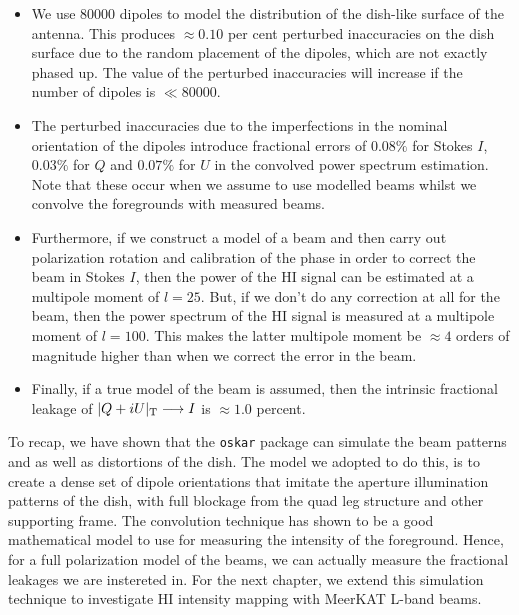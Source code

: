 \begin{itemize}
\item We use $80 000$ dipoles to model the distribution of the dish-like surface of the antenna. This produces $\approx 0.10$ per cent perturbed
inaccuracies on the dish surface due to the random placement of the dipoles, which are not exactly phased up. The value of the perturbed
inaccuracies will increase if the number of dipoles is $\ll 80 000$.
\item The perturbed inaccuracies due to the imperfections in the nominal orientation of the dipoles introduce fractional errors of
$0.08 \%$ for Stokes $I$, $0.03 \%$ for $Q$ and $0.07 \%$ for $U$ in the convolved power spectrum estimation. 
Note that these occur when we assume to use modelled beams whilst we convolve the foregrounds with measured beams.
\item Furthermore, if we construct a model of a beam and then carry out polarization rotation and calibration of the phase in order
to correct the beam in Stokes $I$, then the power of the HI signal can be estimated at a multipole moment of $l = 25$. But, if we don’t do
any correction at all for the beam, then the power spectrum of the HI signal is measured at a multipole moment of $l=100$. This makes
the latter multipole moment be $\approx 4$ orders of magnitude higher than when we correct the error in the beam.

\item Finally, if a true model of the beam is assumed, then the intrinsic fractional leakage of $|Q + iU|_{\rm T} \longrightarrow I$ is $\approx 1.0$ percent.
\end{itemize}
\noindent  To recap, we have shown that the {\tt oskar} package can simulate the beam patterns and as well as distortions of the dish. The model we adopted to do this, is to 
create a dense set of dipole orientations that imitate the aperture illumination patterns of the dish, with full blockage from the quad leg structure and other supporting frame.
The convolution technique has shown to be a good mathematical model to use for measuring the intensity of the foreground. Hence, for a full polarization model 
of the beams, we can  actually measure the fractional leakages we are instereted in. For the next chapter, we extend this simulation technique to investigate HI intensity mapping 
with MeerKAT L-band beams. 
